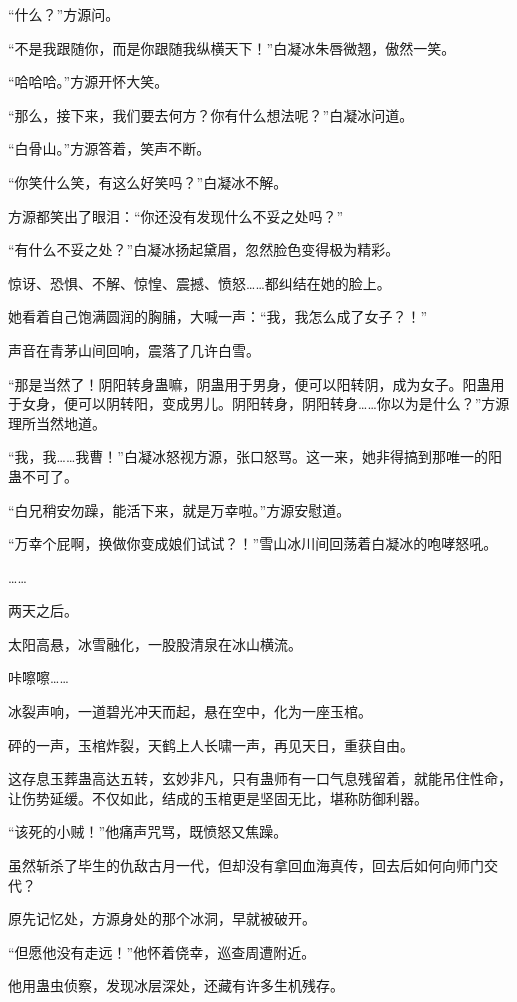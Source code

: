 \begin{this_body}
“什么？”方源问。

“不是我跟随你，而是你跟随我纵横天下！”白凝冰朱唇微翘，傲然一笑。

“哈哈哈。”方源开怀大笑。

“那么，接下来，我们要去何方？你有什么想法呢？”白凝冰问道。

“白骨山。”方源答着，笑声不断。

“你笑什么笑，有这么好笑吗？”白凝冰不解。

方源都笑出了眼泪：“你还没有发现什么不妥之处吗？”

“有什么不妥之处？”白凝冰扬起黛眉，忽然脸色变得极为精彩。

惊讶、恐惧、不解、惊惶、震撼、愤怒……都纠结在她的脸上。

她看着自己饱满圆润的胸脯，大喊一声：“我，我怎么成了女子？！”

声音在青茅山间回响，震落了几许白雪。

“那是当然了！阴阳转身蛊嘛，阴蛊用于男身，便可以阳转阴，成为女子。阳蛊用于女身，便可以阴转阳，变成男儿。阴阳转身，阴阳转身……你以为是什么？”方源理所当然地道。

“我，我……我曹！”白凝冰怒视方源，张口怒骂。这一来，她非得搞到那唯一的阳蛊不可了。

“白兄稍安勿躁，能活下来，就是万幸啦。”方源安慰道。

“万幸个屁啊，换做你变成娘们试试？！”雪山冰川间回荡着白凝冰的咆哮怒吼。

……

两天之后。

太阳高悬，冰雪融化，一股股清泉在冰山横流。

咔嚓嚓……

冰裂声响，一道碧光冲天而起，悬在空中，化为一座玉棺。

砰的一声，玉棺炸裂，天鹤上人长啸一声，再见天日，重获自由。

这存息玉葬蛊高达五转，玄妙非凡，只有蛊师有一口气息残留着，就能吊住性命，让伤势延缓。不仅如此，结成的玉棺更是坚固无比，堪称防御利器。

“该死的小贼！”他痛声咒骂，既愤怒又焦躁。

虽然斩杀了毕生的仇敌古月一代，但却没有拿回血海真传，回去后如何向师门交代？

原先记忆处，方源身处的那个冰洞，早就被破开。

“但愿他没有走远！”他怀着侥幸，巡查周遭附近。

他用蛊虫侦察，发现冰层深处，还藏有许多生机残存。


\end{this_body}
